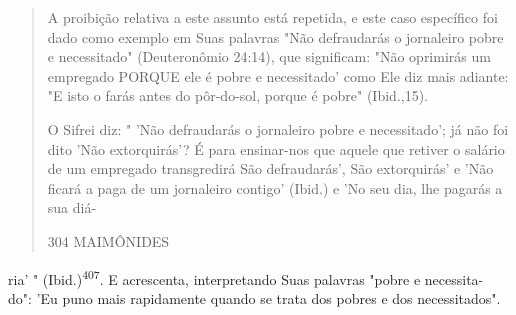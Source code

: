 \begin{quote}
A proibição relativa a este assunto está repetida, e este caso
específi­co foi dado como exemplo em Suas palavras "Não defraudarás o
jornaleiro po­bre e necessitado" (Deuteronômio 24:14), que significam:
"Não oprimirás um empregado PORQUE ele é pobre e necessitado' como Ele
diz mais adiante: "E isto o farás antes do pôr-do-sol, porque é pobre"
(Ibid.,15).

O Sifrei diz: " 'Não defraudarás o jornaleiro pobre e necessitado'; já
não foi dito 'Não extorquirás'? É para ensinar-nos que aquele que
retiver o salá­rio de um empregado transgredirá São defraudarás', São
extorquirás' e 'Não ficará a paga de um jornaleiro contigo' (Ibid.) e
'No seu dia, lhe pagarás a sua diá-

304 MAIMÔNIDES
\end{quote}

ria' " (Ibid.)\textsuperscript{407}. E acrescenta, interpretando Suas
palavras "pobre e necessita-\\
do": 'Eu puno mais rapidamente quando se trata dos pobres e dos
necessitados".

